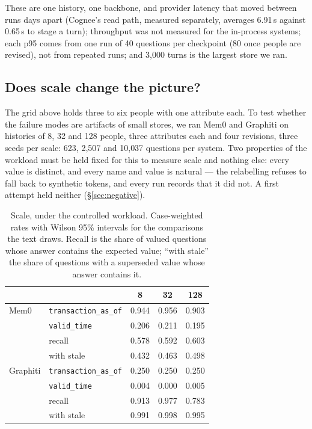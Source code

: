 \documentclass[conference]{IEEEtran}
\begin{document}
These are one history, one backbone, and provider latency that moved between
runs days apart (Cognee's read path, measured separately, averages 6.91\,s
against 0.65\,s to stage a turn); throughput was not measured for the
in-process systems; each p95 comes from one run of 40 questions per checkpoint
(80 once people are revised), not from repeated runs; and 3{,}000 turns is the
largest store we ran.

\subsection{Does scale change the picture?}\label{sec:scale}

The grid above holds three to six people with one attribute each. To test
whether the failure modes are artifacts of small stores, we ran Mem0 and
Graphiti on histories of 8, 32 and 128 people, three attributes each and four
revisions, three seeds per scale: 623, 2{,}507 and 10{,}037 questions per
system. Two properties of the workload must be held fixed for this to measure
scale and nothing else: every value is distinct, and every name and value is
natural --- the relabelling refuses to fall back to synthetic tokens, and every
run records that it did not. A first attempt held neither
(\S\ref{sec:negative}).

\begin{table}[t]
\centering
\caption{Scale, under the controlled workload. Case-weighted rates with
Wilson 95\% intervals for the comparisons the text draws. Recall is the share
of valued questions whose answer contains the expected value; ``with stale''
the share of questions with a superseded value whose answer contains it.}
\label{tab:scale}
\footnotesize
\setlength{\tabcolsep}{3.5pt}
\begin{tabular}{@{}llccc@{}}
\toprule
& & 8 & 32 & 128 \\
\midrule
Mem0     & \texttt{transaction\_as\_of} & 0.944 & 0.956 & 0.903 \\
         & \texttt{valid\_time}         & 0.206 & 0.211 & 0.195 \\
         & recall                       & 0.578 & 0.592 & 0.603 \\
         & with stale                   & 0.432 & 0.463 & 0.498 \\
\midrule
Graphiti & \texttt{transaction\_as\_of} & 0.250 & 0.250 & 0.250 \\
         & \texttt{valid\_time}         & 0.004 & 0.000 & 0.005 \\
         & recall                       & 0.913 & 0.977 & 0.783 \\
         & with stale                   & 0.991 & 0.998 & 0.995 \\
\bottomrule
\end{tabular}
\end{table}
\end{document}
